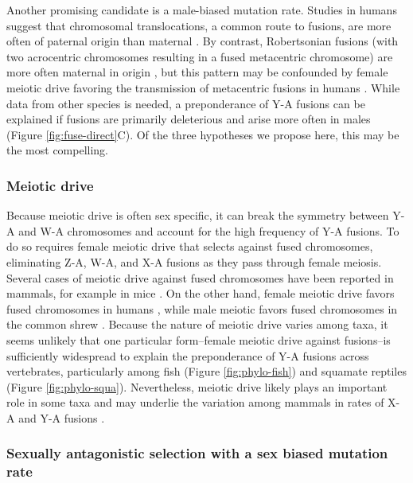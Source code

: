 Another promising candidate is a male-biased mutation rate. Studies in humans suggest that chromosomal translocations, a common route to fusions, are more often of paternal origin than maternal \citep{Batista1993, Thomas2010, Grossmann2010}. By contrast, Robertsonian fusions (with two acrocentric chromosomes resulting in a fused metacentric chromosome) are more often maternal in origin \citep{Chamberlin1980, Bandy2002}, but this pattern may be confounded by female meiotic drive favoring the transmission of metacentric fusions in humans \citep{Pardo2001a}. While data from other species is needed, a preponderance of Y-A fusions can be explained if fusions are primarily deleterious and arise more often in males (Figure \ref{fig:fuse-direct}C). Of the three hypotheses we propose here, this may be the most compelling.

\subsubsection{Meiotic drive}

Because meiotic drive is often sex specific, it can break the symmetry between Y-A and W-A chromosomes and account for the high frequency of Y-A fusions. To do so requires female meiotic drive that selects against fused chromosomes, eliminating Z-A, W-A, and X-A fusions as they pass through female meiosis. Several cases of meiotic drive against fused chromosomes have been reported in mammals, for example in mice \citep{Pardo2001a, Pardo2001b}. On the other hand, female meiotic drive favors fused chromosomes in humans \citep{Pardo2001a}, while male meiotic favors fused chromosomes in the common shrew \citep{Searle1986, Wyttenbach1997}. Because the nature of meiotic drive varies among taxa, it seems unlikely that one particular form--female meiotic drive against fusions--is sufficiently widespread to explain the preponderance of Y-A fusions across vertebrates, particularly among fish (Figure \ref{fig:phylo-fish}) and squamate reptiles (Figure \ref{fig:phylo-squa}). Nevertheless, meiotic drive likely plays an important role in some taxa and may underlie the variation among mammals in rates of X-A and Y-A fusions \citep{Yoshida2012}.

\subsubsection{Sexually antagonistic selection with a sex biased mutation rate}


